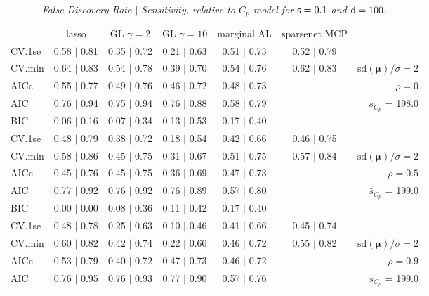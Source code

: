 \documentclass[12pt]{article}
\newcommand{\mr}[1]{\mathrm{#1}}
\newcommand{\bm}[1]{\mathbf{#1}}
\begin{document}
\begin{table}[p]\vspace{-.5cm}
\caption[l]{\label{sens}\it False Discovery Rate $\mid$ Sensitivity, relative to $C_p$ model  for ${\sf s}=0.1$ and ${\sf d}=100$.}
\vspace{-.5cm}
\small{}
\begin{center}
\begin{tabular}{l*{5}{c}|r}
 & lasso & GL $\gamma=2$ & GL $\gamma=10$ & marginal AL & sparsenet MCP  & \\
 \cline{1-7}
CV.1se & 0.58 $\mid$ 0.81 & 0.35 $\mid$ 0.72 & 0.21 $\mid$ 0.63 & 0.51 $\mid$ 0.73 & 0.52 $\mid$ 0.79 &\\
CV.min & 0.64 $\mid$ 0.83 & 0.54 $\mid$ 0.78 & 0.39 $\mid$ 0.70 & 0.54 $\mid$ 0.76 & 0.62 $\mid$ 0.83 &  $\mr{sd}(\bm{\mu})/\sigma=2$ \\
AICc & 0.55 $\mid$ 0.77 & 0.49 $\mid$ 0.76 & 0.46 $\mid$ 0.72 & 0.48 $\mid$ 0.73 & & $\rho=0$ \\
AIC & 0.76 $\mid$ 0.94 & 0.75 $\mid$ 0.94 & 0.76 $\mid$ 0.88 & 0.58 $\mid$ 0.79 & & \multirow{2}{*}{$\bar{s}_{C_p}$ = 198.0} \\
BIC & 0.06 $\mid$ 0.16 & 0.07 $\mid$ 0.34 & 0.13 $\mid$ 0.53 & 0.17 $\mid$ 0.40 & & \\
 \hline 
CV.1se & 0.48 $\mid$ 0.79 & 0.38 $\mid$ 0.72 & 0.18 $\mid$ 0.54 & 0.42 $\mid$ 0.66 & 0.46 $\mid$ 0.75 &\\
CV.min & 0.58 $\mid$ 0.86 & 0.45 $\mid$ 0.75 & 0.31 $\mid$ 0.67 & 0.51 $\mid$ 0.75 & 0.57 $\mid$ 0.84 &  $\mr{sd}(\bm{\mu})/\sigma=2$ \\
AICc & 0.45 $\mid$ 0.76 & 0.45 $\mid$ 0.75 & 0.36 $\mid$ 0.69 & 0.47 $\mid$ 0.73 & & $\rho=0.5$ \\
AIC & 0.77 $\mid$ 0.92 & 0.76 $\mid$ 0.92 & 0.76 $\mid$ 0.89 & 0.57 $\mid$ 0.80 & & \multirow{2}{*}{$\bar{s}_{C_p}$ = 199.0} \\
BIC & 0.00 $\mid$ 0.00 & 0.08 $\mid$ 0.36 & 0.11 $\mid$ 0.42 & 0.17 $\mid$ 0.40 & & \\
 \hline 
CV.1se & 0.48 $\mid$ 0.78 & 0.25 $\mid$ 0.63 & 0.10 $\mid$ 0.46 & 0.41 $\mid$ 0.66 & 0.45 $\mid$ 0.74 &\\
CV.min & 0.60 $\mid$ 0.82 & 0.42 $\mid$ 0.74 & 0.22 $\mid$ 0.60 & 0.46 $\mid$ 0.72 & 0.55 $\mid$ 0.82 &  $\mr{sd}(\bm{\mu})/\sigma=2$ \\
AICc & 0.53 $\mid$ 0.79 & 0.40 $\mid$ 0.72 & 0.47 $\mid$ 0.73 & 0.46 $\mid$ 0.72 & & $\rho=0.9$ \\
AIC & 0.76 $\mid$ 0.95 & 0.76 $\mid$ 0.93 & 0.77 $\mid$ 0.90 & 0.57 $\mid$ 0.76 & & \multirow{2}{*}{$\bar{s}_{C_p}$ = 199.0} \\

\end{tabular}
\end{center}
\end{table}
\end{document}
